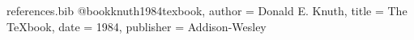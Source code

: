 %
%
%
%
%
%
%
%

\begin{filecontents*}[overwrite]{references.bib}
@book{knuth1984texbook,
  author    = {Donald E. Knuth},
  title     = {The TeXbook},
  date      = {1984},
  publisher = {Addison-Wesley}
}
\end{filecontents*}

\documentclass[11pt,twoside]{nextart}





\setmonofont{Latin Modern Mono}

